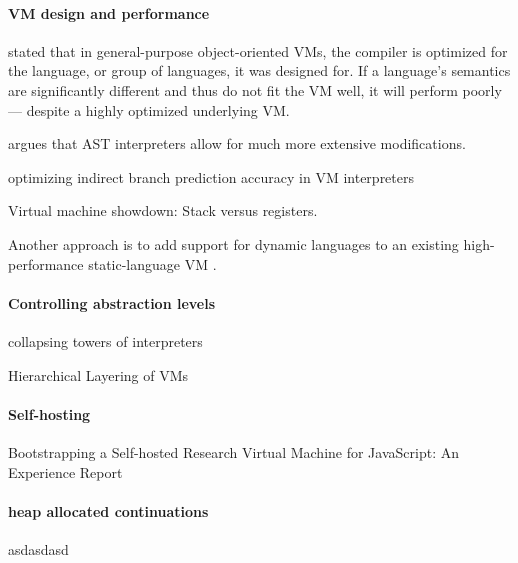 \paragraph{VM design and performance}
\cite{bolz15-meta-vm} stated that in general-purpose object-oriented
VMs, the compiler is optimized for the language, or group of
languages, it was designed for. If a language’s semantics are
significantly different and thus do not fit the VM well, it will
perform poorly— despite a highly optimized underlying VM.

\cite{ast:12} argues that AST interpreters allow for much more
extensive modifications.

\cite{branch-predict:03} optimizing indirect branch prediction
accuracy in VM interpreters

Virtual machine showdown: Stack versus registers.

Another approach is to add support for dynamic languages to an
existing high-performance static-language VM \cite{stJITdyn:12,
  dynStatComp:12}.

\paragraph{Controlling abstraction levels}
collapsing towers of interpreters \cite{collapse:17}

Hierarchical Layering of VMs \cite{layering:09}

\paragraph{Self-hosting}
Bootstrapping a Self-hosted Research Virtual Machine for JavaScript:
An Experience Report \cite{self-hostJSvm:11}

\paragraph{heap allocated continuations}
asdasdasd \cite{whatever:19, compWithContLLVM:16}










